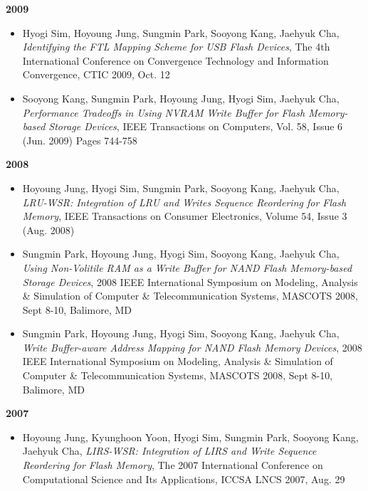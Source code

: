 \documentclass{res}
\begin{document}
\begin{resume}
{\bf 2009}
 \begin{itemize}
  \item Hyogi Sim, Hoyoung Jung, Sungmin Park, Sooyong Kang, Jaehyuk Cha,
  {\it Identifying the FTL Mapping Scheme for USB Flash Devices},
  The 4th International Conference on Convergence Technology
  and Information Convergence, CTIC 2009, Oct. 12
  \item Sooyong Kang, Sungmin Park, Hoyoung Jung, Hyogi Sim, Jaehyuk Cha,
  {\it Performance Tradeoffs in Using NVRAM Write Buffer for Flash Memory-based
  Storage Devices},
  IEEE Transactions on Computers, Vol. 58, Issue 6 (Jun. 2009) Pages 744-758
 \end{itemize}

{\bf 2008}
 \begin{itemize}
 \item Hoyoung Jung, Hyogi Sim, Sungmin Park, Sooyong Kang, Jaehyuk Cha,
 {\it LRU-WSR: Integration of LRU and Writes Sequence Reordering for Flash
 Memory},
 IEEE Transactions on Consumer Electronics, Volume 54, Issue 3 (Aug. 2008)
 \end{itemize}
 \begin{itemize}
 \item Sungmin Park, Hoyoung Jung, Hyogi Sim, Sooyong Kang, Jaehyuk Cha,
 {\it Using Non-Volitile RAM as a Write Buffer for NAND Flash Memory-based
 Storage Devices},
 2008 IEEE International Symposium on Modeling, Analysis \& Simulation of
 Computer \& Telecommunication Systems, MASCOTS 2008, Sept 8-10, Balimore, MD
 \end{itemize}
 \begin{itemize}
 \item Sungmin Park, Hoyoung Jung, Hyogi Sim, Sooyong Kang, Jaehyuk Cha,
 {\it Write Buffer-aware Address Mapping for NAND Flash Memory Devices},
 2008 IEEE International Symposium on Modeling, Analysis \& Simulation of
 Computer \& Telecommunication Systems, MASCOTS 2008, Sept 8-10, Balimore, MD
 \end{itemize}

{\bf 2007}
 \begin{itemize}
 \item Hoyoung Jung, Kyunghoon Yoon, Hyogi Sim, Sungmin Park, Sooyong Kang,
 Jaehyuk Cha,
 {\it LIRS-WSR: Integration of LIRS and Write Sequence Reordering for Flash
 Memory},
 The 2007 International Conference on Computational Science and Its
 Applications, ICCSA LNCS 2007, Aug. 29
 \end{itemize}


\end{resume}
\end{document}
